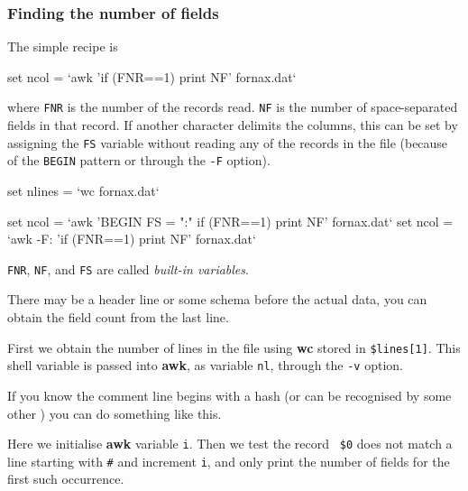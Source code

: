 \documentclass[twoside,11pt,nolof]{starlink}
\begin{document}
\subsubsection{Finding the number of fields\label{sc4_se_find_nf}}

The simple recipe is
\begin{small}
\begin{terminalv}
     set ncol = `awk '{if (FNR==1) print NF}' fornax.dat`
\end{terminalv}
\end{small}
where \texttt{FNR} is the number of the records read.  \texttt{NF} is the number of
space-separated fields in that record.  If another character delimits
the columns, this can be set by assigning the \texttt{FS} variable without
reading any of the records in the file (because of the \texttt{BEGIN}
pattern or through the \texttt{-F} option).
\begin{small}
\begin{terminalv}
    set nlines = `wc fornax.dat`

    set ncol = `awk 'BEGIN { FS = ":" }{if (FNR==1) print NF}' fornax.dat`
    set ncol = `awk -F: '{if (FNR==1) print NF}' fornax.dat`
\end{terminalv}
\end{small}
\texttt{FNR}, \texttt{NF}, and \texttt{FS} are called \emph{built-in variables}.

There may be a header line or some schema before the actual data, you
can obtain the field count from the last line.
\begin{small}
\end{small}
First we obtain the number of lines in the file using \textbf{wc} stored
in \texttt{\$lines[1]}.  This shell variable is passed into \textbf{awk}, as
variable \texttt{nl}, through the \texttt{-v} option.

If you know the comment line begins with a hash (or can be recognised
by some other ) you
can do something like this.
\begin{small}
\end{small}
Here we initialise \textbf{awk} variable \texttt{i}.  Then we test the record {\tt
\$0} does not match a line starting with \texttt{\#} and increment \texttt{i},
and only print the number of fields for the first such occurrence.
\end{document}
